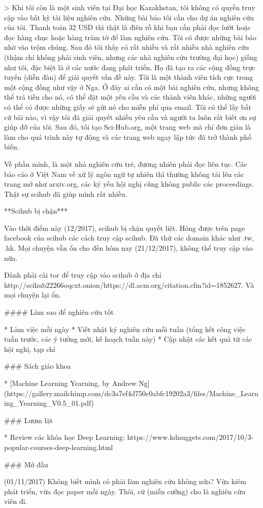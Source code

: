 > Khi tôi còn là một sinh viên tại Đại học Kazakhstan, tôi không có quyền truy cập vào bất kỳ tài liệu nghiên cứu. Những bài báo tôi cần cho dự án nghiên cứu của tôi. Thanh toán 32 USD thì thật là điên rồ khi bạn cần phải đọc lướt hoặc đọc hàng chục hoặc hàng trăm tờ để làm nghiên cứu. Tôi có được những bài báo nhờ vào trộm chúng. Sau đó tôi thấy có rất nhiều và rất nhiều nhà nghiên cứu (thậm chí không phải sinh viên, nhưng các nhà nghiên cứu trường đại học) giống như tôi, đặc biệt là ở các nước đang phát triển. Họ đã tạo ra các cộng đồng trực tuyến (diễn đàn) để giải quyết vấn đề này. Tôi là một thành viên tích cực trong một cộng đồng như vậy ở Nga. Ở đây ai cần có một bài nghiên cứu, nhưng không thể trả tiền cho nó, có thể đặt một yêu cầu và các thành viên khác, những người có thể có được những giấy sẽ gửi nó cho miễn phí qua email. Tôi có thể lấy bất cứ bài nào, vì vậy tôi đã giải quyết nhiều yêu cầu và người ta luôn rất biết ơn sự giúp đỡ của tôi. Sau đó, tôi tạo Sci-Hub.org, một trang web mà chỉ đơn giản là làm cho quá trình này tự động và các trang web ngay lập tức đã trở thành phổ biến.

Về phần mình, là một nhà nghiên cứu trẻ, đương nhiên phải đọc liên tục. Các báo cáo ở Việt Nam về xử lý ngôn ngữ tự nhiên thì thường không tải lên các trang mở như arxiv.org, các kỷ yếu hội nghị cũng không public các proceedings. Thật sự scihub đã giúp mình rất nhiều.

**Scihub bị chặn***

Vào thời điểm này (12/2017), scihub bị chặn quyết liệt. Hóng được trên page facebook của scihub các cách truy cập scihub. Đã thử các domain khác như .tw, .hk. Mọi chuyện vẫn ổn cho đến hôm nay (21/12/2017), không thể truy cập vào nữa.

Đành phải cài tor để truy cập vào scihub ở địa chỉ http://scihub22266oqcxt.onion/https://dl.acm.org/citation.cfm?id=1852627. Và mọi chuyện lại ổn.

#### Làm sao để nghiên cứu tốt

* Làm việc mỗi ngày
* Viết nhật ký nghiên cứu mỗi tuần (tổng kết công việc tuần trước, các ý tưởng mới, kế hoạch tuần này)
* Cập nhật các kết quả từ các hội nghị, tạp chí

### Sách giáo khoa

* [Machine Learning Yearning, by Andrew Ng](https://gallery.mailchimp.com/dc3a7ef4d750c0abfc19202a3/files/Machine_Learning_Yearning_V0.5_01.pdf)

### Lượm lặt 

* Review các khóa học Deep Learning: https://www.kdnuggets.com/2017/10/3-popular-courses-deep-learning.html

### Mở đầu

(01/11/2017) Không biết mình có phải làm nghiên cứu không nữa? Vừa kiêm phát triển, vừa đọc paper mỗi ngày. Thôi, cứ (miễn cưỡng) cho là nghiên cứu viên đi.
